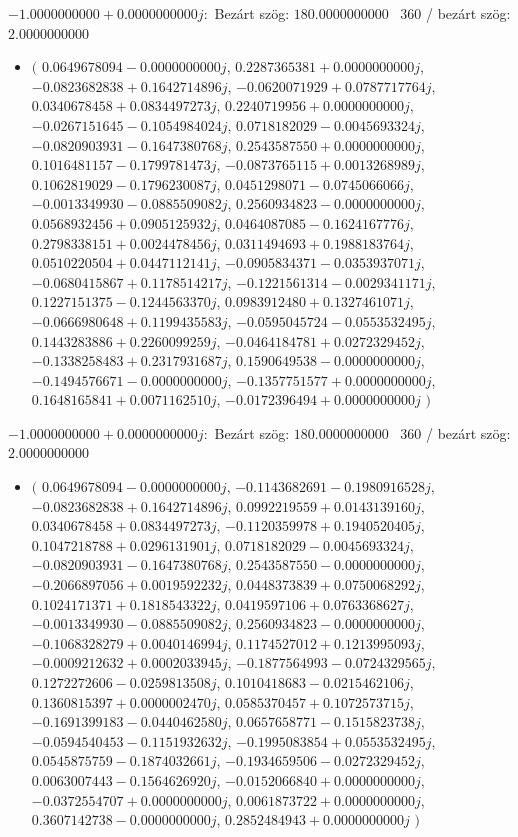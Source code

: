\documentclass[14pt,a4paper]{article}
\begin{document}
$-1.0000000000+0.0000000000j$:\
Bezárt szög: $180.0000000000$ \
360 / bezárt szög: $2.0000000000$\
\begin{itemize}
\item
$\big($
$0.0649678094-0.0000000000j$, $0.2287365381+0.0000000000j$, $-0.0823682838+0.1642714896j$, $-0.0620071929+0.0787717764j$, $0.0340678458+0.0834497273j$, $0.2240719956+0.0000000000j$, $-0.0267151645-0.1054984024j$, $0.0718182029-0.0045693324j$, $-0.0820903931-0.1647380768j$, $0.2543587550+0.0000000000j$, $0.1016481157-0.1799781473j$, $-0.0873765115+0.0013268989j$, $0.1062819029-0.1796230087j$, $0.0451298071-0.0745066066j$, $-0.0013349930-0.0885509082j$, $0.2560934823-0.0000000000j$, $0.0568932456+0.0905125932j$, $0.0464087085-0.1624167776j$, $0.2798338151+0.0024478456j$, $0.0311494693+0.1988183764j$, $0.0510220504+0.0447112141j$, $-0.0905834371-0.0353937071j$, $-0.0680415867+0.1178514217j$, $-0.1221561314-0.0029341171j$, $0.1227151375-0.1244563370j$, $0.0983912480+0.1327461071j$, $-0.0666980648+0.1199435583j$, $-0.0595045724-0.0553532495j$, $0.1443283886+0.2260099259j$, $-0.0464184781+0.0272329452j$, $-0.1338258483+0.2317931687j$, $0.1590649538-0.0000000000j$, $-0.1494576671-0.0000000000j$, $-0.1357751577+0.0000000000j$, $0.1648165841+0.0071162510j$, $-0.0172396494+0.0000000000j$
$\big)$
\end{itemize}
$-1.0000000000+0.0000000000j$:\
Bezárt szög: $180.0000000000$ \
360 / bezárt szög: $2.0000000000$\
\begin{itemize}
\item
$\big($
$0.0649678094-0.0000000000j$, $-0.1143682691-0.1980916528j$, $-0.0823682838+0.1642714896j$, $0.0992219559+0.0143139160j$, $0.0340678458+0.0834497273j$, $-0.1120359978+0.1940520405j$, $0.1047218788+0.0296131901j$, $0.0718182029-0.0045693324j$, $-0.0820903931-0.1647380768j$, $0.2543587550-0.0000000000j$, $-0.2066897056+0.0019592232j$, $0.0448373839+0.0750068292j$, $0.1024171371+0.1818543322j$, $0.0419597106+0.0763368627j$, $-0.0013349930-0.0885509082j$, $0.2560934823-0.0000000000j$, $-0.1068328279+0.0040146994j$, $0.1174527012+0.1213995093j$, $-0.0009212632+0.0002033945j$, $-0.1877564993-0.0724329565j$, $0.1272272606-0.0259813508j$, $0.1010418683-0.0215462106j$, $0.1360815397+0.0000002470j$, $0.0585370457+0.1072573715j$, $-0.1691399183-0.0440462580j$, $0.0657658771-0.1515823738j$, $-0.0594540453-0.1151932632j$, $-0.1995083854+0.0553532495j$, $0.0545875759-0.1874032661j$, $-0.1934659506-0.0272329452j$, $0.0063007443-0.1564626920j$, $-0.0152066840+0.0000000000j$, $-0.0372554707+0.0000000000j$, $0.0061873722+0.0000000000j$, $0.3607142738-0.0000000000j$, $0.2852484943+0.0000000000j$
$\big)$
\end{itemize}
\end{document}

